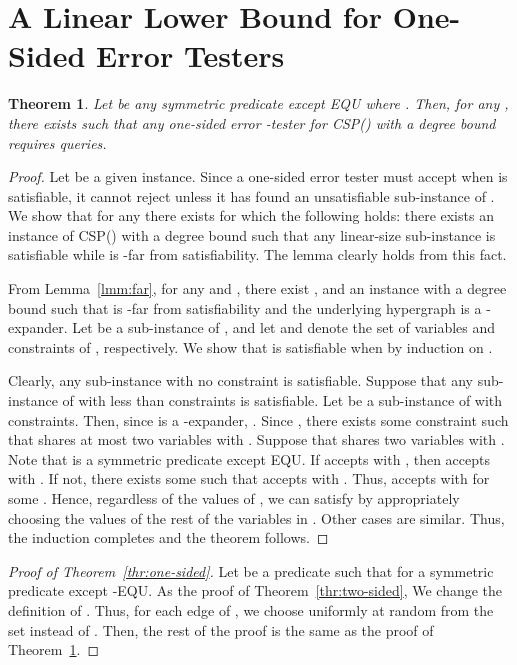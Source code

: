 \documentclass[letterpaper,11pt]{article}
\newtheorem{theorem}{Theorem}[section]
\newcommand{\csp}[1]{\textsf{CSP}(#1)\xspace}
\newcommand{\equ}{\textsf{EQU}\xspace}
\newcommand{\kequ}{-\textsf{EQU}\xspace}
\begin{document}
\section{A Linear Lower Bound for One-Sided Error Testers}\label{apx:one-sided}
\begin{theorem}\label{thr:one-sided-weak}
  Let  be any symmetric predicate except \equ where .
  Then,
  for any , 
  there exists  such that any one-sided error -tester for \csp{} with a degree bound  requires  queries.
\end{theorem}
\begin{proof}
  Let  be a given instance.
  Since a one-sided error tester must accept  when  is satisfiable,
  it cannot reject  unless it has found an unsatisfiable sub-instance of .
  We show that for any  there exists  for which the following holds: 
  there exists an instance  of \csp{} with a degree bound  such that any linear-size sub-instance is satisfiable while  is -far from satisfiability.
  The lemma clearly holds from this fact.

  From Lemma~\ref{lmm:far}, 
  for any  and ,
  there exist , and an instance  with a degree bound  such that  is -far from satisfiability and the underlying hypergraph is a -expander.
  Let  be a sub-instance of ,
  and let  and  denote the set of variables and constraints of , respectively.
  We show that  is satisfiable when  by induction on .

  Clearly, any sub-instance with no constraint is satisfiable.
  Suppose that any sub-instance of  with less than  constraints is satisfiable.
  Let  be a sub-instance of  with  constraints.
  Then, since  is a -expander,
  .
  Since , 
  there exists some constraint  such that  shares at most two variables with .
  Suppose that  shares two variables  with .
  Note that  is a symmetric predicate except \equ.
  If  accepts  with , 
  then  accepts  with .
  If not, there exists some  such that  accepts  with .
  Thus,  accepts  with  for some .
  Hence, regardless of the values of ,
  we can satisfy  by appropriately choosing the values of the rest of the variables in .
  Other cases are similar.
  Thus, the induction completes and the theorem follows.
\end{proof}
\begin{proof}[Proof of Theorem~\ref{thr:one-sided}]
  Let  be a predicate such that  for a symmetric predicate  except \kequ.
  As the proof of Theorem~\ref{thr:two-sided},
  We change the definition of .  
  Thus, 
  for each edge  of ,
  we choose  uniformly at random from the set  instead of .
  Then, the rest of the proof is the same as the proof of Theorem~\ref{thr:one-sided-weak}.
\end{proof}
\end{document}
